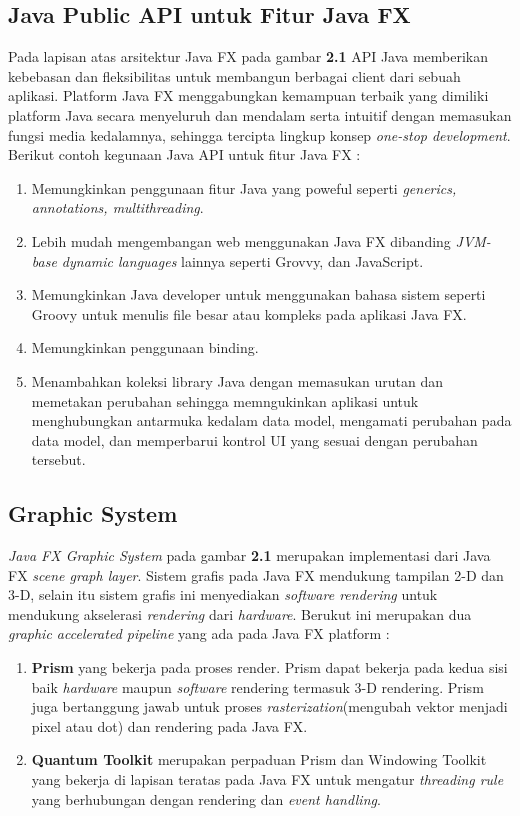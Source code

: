 \subsection{Java Public API untuk Fitur Java FX}
Pada lapisan atas arsitektur Java FX pada gambar \textbf{2.1} API Java memberikan kebebasan dan fleksibilitas untuk membangun berbagai client dari sebuah aplikasi. Platform Java FX menggabungkan kemampuan terbaik yang dimiliki platform Java secara menyeluruh dan mendalam serta intuitif dengan memasukan fungsi media kedalamnya, sehingga tercipta lingkup konsep \textit{one-stop development}. Berikut contoh kegunaan Java API untuk fitur Java FX :\cite{javafx}
\begin{enumerate}
	\item Memungkinkan penggunaan fitur Java yang poweful seperti \textit{generics, annotations, multithreading}.
	\item Lebih mudah mengembangan web menggunakan Java FX dibanding \textit{JVM-base dynamic languages} lainnya seperti Grovvy, dan JavaScript.
	\item Memungkinkan Java developer untuk menggunakan bahasa sistem seperti Groovy untuk menulis file besar atau kompleks pada aplikasi Java FX.
	\item Memungkinkan penggunaan binding.
	\item Menambahkan koleksi library Java dengan memasukan urutan dan memetakan perubahan sehingga memngukinkan aplikasi untuk menghubungkan antarmuka kedalam data model, mengamati perubahan pada data model, dan memperbarui kontrol UI yang sesuai dengan perubahan tersebut.   
\end{enumerate}

\subsection{Graphic System}
\textit{Java FX Graphic System} pada gambar \textbf{2.1} merupakan implementasi dari Java FX \textit{scene graph layer}. Sistem grafis pada Java FX mendukung tampilan 2-D dan 3-D, selain itu sistem grafis ini menyediakan \textit{software rendering} untuk mendukung akselerasi \textit{rendering} dari \textit{hardware}. Berukut ini merupakan dua \textit{graphic accelerated pipeline} yang ada pada Java FX platform :\cite{javafx}
\begin{enumerate}
	\item \textbf{Prism} yang bekerja pada proses render. Prism dapat bekerja pada kedua sisi baik \textit{hardware} maupun \textit{software} rendering termasuk 3-D rendering. Prism juga bertanggung jawab untuk proses \textit{rasterization}(mengubah vektor menjadi pixel atau dot) dan rendering pada Java FX.
	\item \textbf{Quantum Toolkit} merupakan perpaduan Prism dan Windowing Toolkit yang bekerja di lapisan teratas pada Java FX untuk mengatur \textit{threading rule} yang berhubungan dengan rendering dan \textit{event handling}. 
\end{enumerate}

